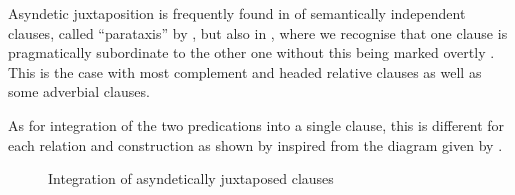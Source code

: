 Asyndetic juxtaposition is frequently found in  of semantically independent clauses, called “parataxis” by \citet[]{Lehmann1988}, but also in , where we recognise that one clause is pragmatically subordinate to the other one without this being marked overtly \citep[cf.][355]{Mithun1988}. This is the case with most complement and headed relative clauses as well as some adverbial clauses.

As for integration of the two predications into a single clause, this is different for each relation and construction as shown by  inspired from the diagram given by \citet[307]{Payne1997}. 

\begin{figure}
\caption{Integration of asyndetically juxtaposed clauses}
\label{fig:IntegrationScaleAsyndeticJuxtaposition}
\end{figure}


